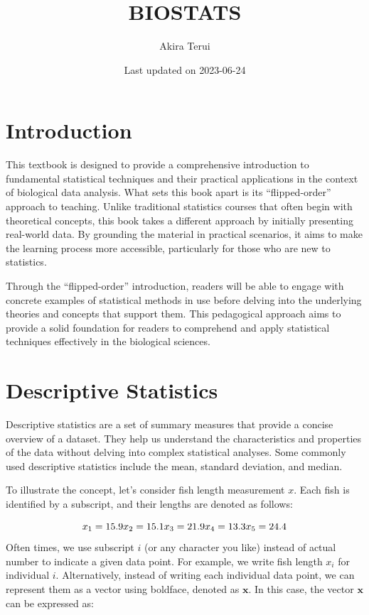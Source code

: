 \documentclass[
]{book}
\title{BIOSTATS}
\author{Akira Terui}
\date{Last updated on 2023-06-24}
\begin{document}
\maketitle

{
\setcounter{tocdepth}{1}
\tableofcontents
}
\hypertarget{introduction}{%
\chapter*{Introduction}\label{introduction}}

This textbook is designed to provide a comprehensive introduction to fundamental statistical techniques and their practical applications in the context of biological data analysis. What sets this book apart is its ``flipped-order'' approach to teaching. Unlike traditional statistics courses that often begin with theoretical concepts, this book takes a different approach by initially presenting real-world data. By grounding the material in practical scenarios, it aims to make the learning process more accessible, particularly for those who are new to statistics.

Through the ``flipped-order'' introduction, readers will be able to engage with concrete examples of statistical methods in use before delving into the underlying theories and concepts that support them. This pedagogical approach aims to provide a solid foundation for readers to comprehend and apply statistical techniques effectively in the biological sciences.

\hypertarget{descriptive-statistics}{%
\chapter{Descriptive Statistics}\label{descriptive-statistics}}

Descriptive statistics are a set of summary measures that provide a concise overview of a dataset. They help us understand the characteristics and properties of the data without delving into complex statistical analyses. Some commonly used descriptive statistics include the mean, standard deviation, and median.

To illustrate the concept, let's consider fish length measurement \(x\). Each fish is identified by a subscript, and their lengths are denoted as follows:

\[
x_1 = 15.9\\
x_2 = 15.1\\
x_3 = 21.9\\
x_4 = 13.3\\
x_5 = 24.4\\
\] Often times, we use subscript \(i\) (or any character you like) instead of actual number to indicate a given data point. For example, we write fish length \(x_i\) for individual \(i\). Alternatively, instead of writing each individual data point, we can represent them as a vector using boldface, denoted as \(\pmb{x}\). In this case, the vector \(\pmb{x}\) can be expressed as:
\end{document}
